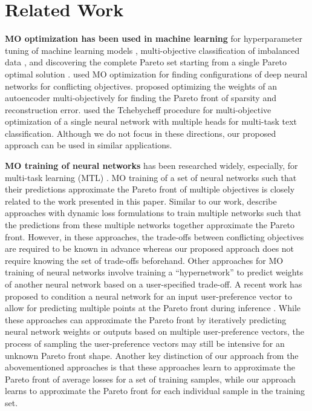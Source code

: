 \section{Related Work}
\textbf{MO optimization has been used in machine learning} for hyperparameter tuning of machine learning models \citep{koch2015efficient, avent2020automatic}, multi-objective classification of imbalanced data \citep{tari2020automatic}, and discovering the complete Pareto set starting from a single Pareto optimal solution \citep{ma2020efficient}. \cite{iqbal2020flexibo} used MO optimization for finding configurations of deep neural networks for conflicting objectives. \cite{gong2015multiobjective} proposed optimizing the weights of an autoencoder multi-objectively for finding the Pareto front of sparsity and reconstruction error. \cite{mao2020tchebycheff} used the Tchebycheff procedure for multi-objective optimization of a single neural network with multiple heads for multi-task text classification. Although we do not focus in these directions, our proposed approach can be used in similar applications.

\textbf{MO training of neural networks} has been researched widely, especially, for multi-task learning (MTL) \citep{sener2018multi, lin2019paretomtl, mahapatra2020multi, ma2020efficient, lin2020controllable, navon2020learning}. MO training of a set of neural networks such that their predictions approximate the Pareto front of multiple objectives is closely related to the work presented in this paper. Similar to our work, \cite{lin2019paretomtl,mahapatra2020multi} describe approaches with dynamic loss formulations to train multiple networks such that the predictions from these multiple networks together approximate the Pareto front. However, in these approaches, the trade-offs between conflicting objectives are required to be known in advance whereas our proposed approach does not require knowing the set of trade-offs beforehand. Other approaches \citep{navon2020learning,lin2020controllable} for MO training of neural networks involve training a ``hypernetwork'' to predict weights of another neural network based on a user-specified trade-off. A recent work has proposed to condition a neural network for an input user-preference vector to allow for predicting multiple points at the Pareto front during inference \citep{DBLP:journals/corr/abs-2103-13392}. While these approaches can approximate the Pareto front by iteratively predicting neural network weights or outputs based on multiple user-preference vectors, the process of sampling the user-preference vectors may still be intensive for an unknown Pareto front shape. Another key distinction of our approach from the abovementioned approaches is that these approaches learn to approximate the Pareto front of average losses for a set of training samples, while our approach learns to approximate the Pareto front for each individual sample in the training set. 

